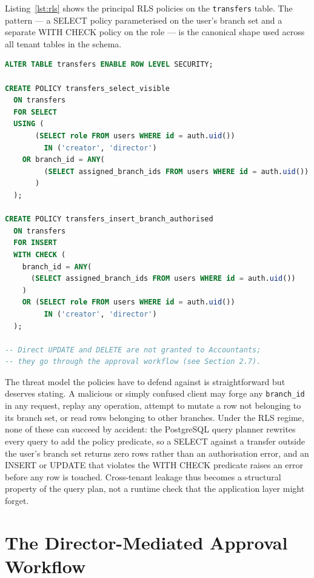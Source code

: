 Listing~\ref{lst:rls} shows the principal RLS policies on the \texttt{transfers} table. The pattern --- a SELECT policy parameterised on the user's branch set and a separate WITH CHECK policy on the role --- is the canonical shape used across all tenant tables in the schema.

\begin{lstlisting}[language=SQL,caption={Row-Level Security policies on \texttt{transfers}},label={lst:rls}]
ALTER TABLE transfers ENABLE ROW LEVEL SECURITY;

CREATE POLICY transfers_select_visible
  ON transfers
  FOR SELECT
  USING (
       (SELECT role FROM users WHERE id = auth.uid())
         IN ('creator', 'director')
    OR branch_id = ANY(
         (SELECT assigned_branch_ids FROM users WHERE id = auth.uid())
       )
  );

CREATE POLICY transfers_insert_branch_authorised
  ON transfers
  FOR INSERT
  WITH CHECK (
    branch_id = ANY(
      (SELECT assigned_branch_ids FROM users WHERE id = auth.uid())
    )
    OR (SELECT role FROM users WHERE id = auth.uid())
         IN ('creator', 'director')
  );

-- Direct UPDATE and DELETE are not granted to Accountants;
-- they go through the approval workflow (see Section 2.7).
\end{lstlisting}

The threat model the policies have to defend against is straightforward but deserves stating. A malicious or simply confused client may forge any \texttt{branch\_id} in any request, replay any operation, attempt to mutate a row not belonging to its branch set, or read rows belonging to other branches. Under the RLS regime, none of these can succeed by accident: the PostgreSQL query planner rewrites every query to add the policy predicate, so a SELECT against a transfer outside the user's branch set returns zero rows rather than an authorisation error, and an INSERT or UPDATE that violates the WITH CHECK predicate raises an error before any row is touched. Cross-tenant leakage thus becomes a structural property of the query plan, not a runtime check that the application layer might forget.

\section{The Director-Mediated Approval Workflow}
\label{sec:approval}


